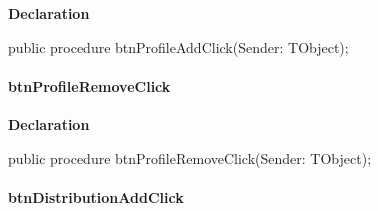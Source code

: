 \documentclass{report}
\newif\ifpdf
\begin{document}
\label{prjwizard.TfrmProjectWizard-btnProfileAddClick}
\begin{list}{}{
\setlength{\itemindent}{0cm}
\setlength{\listparindent}{0cm}
\setlength{\leftmargin}{\evensidemargin}
\addtolength{\leftmargin}{\tmplength}
\settowidth{\labelsep}{X}
\addtolength{\leftmargin}{\labelsep}
\setlength{\labelwidth}{\tmplength}
}
\item[\textbf{Declaration}\hfill]
\ifpdf
\begin{flushleft}
\fi
\begin{ttfamily}
public procedure btnProfileAddClick(Sender: TObject);\end{ttfamily}

\ifpdf
\end{flushleft}
\fi

\end{list}
\paragraph*{btnProfileRemoveClick}\hspace*{\fill}

\label{prjwizard.TfrmProjectWizard-btnProfileRemoveClick}
\begin{list}{}{
\setlength{\itemindent}{0cm}
\setlength{\listparindent}{0cm}
\setlength{\leftmargin}{\evensidemargin}
\addtolength{\leftmargin}{\tmplength}
\settowidth{\labelsep}{X}
\addtolength{\leftmargin}{\labelsep}
\setlength{\labelwidth}{\tmplength}
}
\item[\textbf{Declaration}\hfill]
\ifpdf
\begin{flushleft}
\fi
\begin{ttfamily}
public procedure btnProfileRemoveClick(Sender: TObject);\end{ttfamily}

\ifpdf
\end{flushleft}
\fi

\end{list}
\paragraph*{btnDistributionAddClick}\hspace*{\fill}
\end{document}
